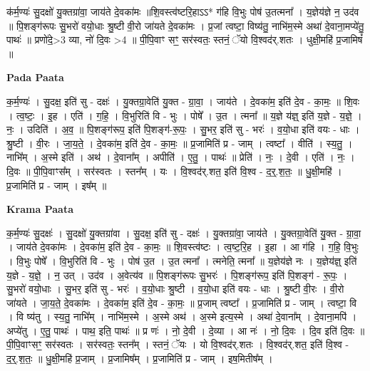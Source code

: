 \documentclass[17pt]{extarticle}
\begin{document}
क॑र्म॒ण्यः॑ सु॒दक्षो॑ यु॒क्तग्रा॑वा॒ जाय॑ते दे॒वका॑मः ॥शि॒वस्त्व॑ष्टरि॒हाऽऽ* ग॑हि वि॒भुः पोष॑ उ॒तत्मना᳚ । य॒ज्ञेय॑ज्ञे न॒ उद॑व ॥ पि॒शङ्ग॑रूपः सु॒भरो॑ वयो॒धाः श्रु॒ष्टी वी॒रो जा॑यते दे॒वका॑मः । प्र॒जां त्वष्टा॒ विष्य॑तु॒ नाभि॑म॒स्मे अथा॑ दे॒वाना॒मप्ये॑तु॒ पाथः॑ ॥ प्रणो॑दे॒>3 व्या, नो॑ दि॒वः >4 ॥ पी॒पि॒वाꣳ सꣳ॒॒ सर॑स्वतः॒ स्तनं॒ ॅयो वि॒श्वद॑र्.शतः । धुक्षी॒महि॑ प्र॒जामिषं᳚ ॥ \newline

\textbf{Pada Paata} \newline

क॒र्म॒ण्यः॑ । सु॒दक्ष॒ इति॑ सु - दक्षः॑ । यु॒क्तग्रा॒वेति॑ यु॒क्त - ग्रा॒वा॒ । जाय॑ते । दे॒वका॑म॒ इति॑ दे॒व - का॒मः॒ ॥ शि॒वः । त्व॒ष्टः॒ । इ॒ह । एति॑ । ग॒हि॒ । वि॒भुरिति॑ वि - भुः । पोषे᳚ । उ॒त । त्मना᳚ ॥ य॒ज्ञे य॑ज्ञ्॒ इति॑ य॒ज्ञे - य॒ज्ञे॒ । नः॒ । उदिति॑ । अ॒व॒ ॥ पि॒शङ्ग॑रूप॒ इति॑ पि॒शङ्ग॑-रू॒पः॒ । सु॒भर॒ इति॑ सु - भरः॑ । व॒यो॒धा इति॑ वयः - धाः । श्रु॒ष्टी । वी॒रः । जा॒य॒ते॒ । दे॒वका॑म॒ इति॑ दे॒व - का॒मः॒ ॥ प्र॒जामिति॑ प्र - जाम् । त्वष्टा᳚ । वीति॑ । स्य॒तु॒ । नाभि᳚म् । अ॒स्मे इति॑ । अथ॑ । दे॒वाना᳚म् । अपीति॑ । ए॒तु॒ । पाथः॑ ॥ प्रेति॑ । नः॒ । दे॒वी । एति॑ । नः॒ । दि॒वः ॥ पी॒पि॒वाꣳस᳚म् । सर॑स्वतः । स्तन᳚म् । यः । वि॒श्वद॑र्.शत॒ इति॑ वि॒श्व - द॒र्॒.श॒तः॒ ॥ धु॒क्षी॒महि॑ । प्र॒जामिति॑ प्र - जाम् । इष᳚म् ॥  \newline


\textbf{Krama Paata} \newline

क॒र्म॒ण्यः॑ सु॒दक्षः॑ । सु॒दक्षो॑ यु॒क्तग्रा॑वा । सु॒दक्ष॒ इति॑ सु - दक्षः॑ । यु॒क्तग्रा॑वा॒ जाय॑ते । यु॒क्तग्रा॒वेति॑ यु॒क्त - ग्रा॒वा॒ । जाय॑ते दे॒वका॑मः । दे॒वका॑म॒ इति॑ दे॒व - का॒मः॒ ॥ शि॒वस्त्व॑ष्टः । त्व॒ष्ट॒रि॒ह । इ॒हा । आ ग॑हि । ग॒हि॒ वि॒भुः । वि॒भुः पोषे᳚ । वि॒भुरिति॑ वि - भुः । पोष॑ उ॒त । उ॒त त्मना᳚ । त्मनेति॒ त्मना᳚ ॥ य॒ज्ञेय॑ज्ञे नः । य॒ज्ञेय॑ज्ञ्॒ इति॑ य॒ज्ञे - य॒ज्ञे॒ । न॒ उत् । उद॑व । अ॒वेत्य॑व ॥ पि॒शङ्ग॑रूपः सु॒भरः॑ । पि॒शङ्ग॑रूप॒ इति॑ पि॒शङ्ग॑ - रू॒पः॒ । सु॒भरो॑ वयो॒धाः । सु॒भर॒ इति॑ सु - भरः॑ । व॒यो॒धाः श्रु॒ष्टी । व॒यो॒धा इति॑ वयः - धाः । श्रु॒ष्टी वी॒रः । वी॒रो जा॑यते । जा॒य॒ते॒ दे॒वका॑मः । दे॒वका॑म॒ इति॑ दे॒व - का॒मः॒ ॥ प्र॒जाम् त्वष्टा᳚ । प्र॒जामिति॑ प्र - जाम् । त्वष्टा॒ वि । वि ष्य॑तु । स्य॒तु॒ नाभि᳚म् । नाभि॑म॒स्मे । अ॒स्मे अथ॑ । अ॒स्मे इत्य॒स्मे । अथा॑ दे॒वाना᳚म् । दे॒वाना॒मपि॑ । अप्ये॑तु । ए॒तु॒ पाथः॑ । पाथ॒ इति॒ पाथः॑ ॥ प्र णः॑ । नो॒ दे॒वी । दे॒व्या । आ नः॑ । नो॒ दि॒वः । दि॒व इति॑ दि॒वः ॥ पी॒पि॒वाꣳसꣳ॒॒ सर॑स्वतः । सर॑स्वतः॒ स्तन᳚म् । स्तनं॒ ॅयः । यो वि॒श्वद॑र्.शतः । वि॒श्वद॑र्.शत॒ इति॑ वि॒श्व - द॒र्॒.श॒तः॒ ॥ धु॒क्षी॒महि॑ प्र॒जाम् । प्र॒जामिष᳚म् । प्र॒जामिति॑ प्र - जाम् । इष॒मितीष᳚म् । \newline
\end{document}

